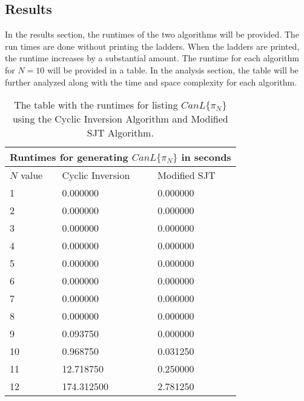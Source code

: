 

\subsection{Results}
    In the results section, the runtimes of the two algorithms will be provided. The run times are done without printing the ladders. When the ladders are printed, the runtime increases by a substantial amount. 
    The runtime for each algorithm for $N=10$ will be provided in a table. In the analysis section, the table will be further analyzed along with 
    the time and space complexity for each algorithm.
\begin{table}
    \begin{tabular}{ |p{3cm}||p{3cm}|p{3cm}|}
        \hline
        \multicolumn{3}{|c|}{Runtimes for generating $CanL\{\pi_{N}\}$ in seconds} \\
        \hline
            $N$ value& Cyclic Inversion & Modified SJT\\
        \hline
            1   & 0.000000    &0.000000\\
            \hline
            2 &   0.000000  & 0.000000\\

            \hline
            3 &0.000000 & 0.000000\\
            \hline
            4 &0.000000 & 0.000000\\
            \hline
            5 &   0.000000  & 0.000000\\
            \hline
            6 & 0.000000  & 0.000000  \\
            \hline
            7 & 0.000000  & 0.000000\\
            \hline
            8 & 0.000000 & 0.000000\\
            \hline
            9 & 0.093750 & 0.000000\\
            \hline
            10 & 0.968750 & 0.031250\\
            \hline

            11 & 12.718750 & 0.250000\\
            \hline 
            12 & 174.312500 & 2.781250\\
        \hline
\end{tabular}
    \caption{The table with the runtimes for listing $CanL\{\pi_{N}\}$ using the Cyclic Inversion Algorithm and Modified SJT Algorithm.}
\end{table}